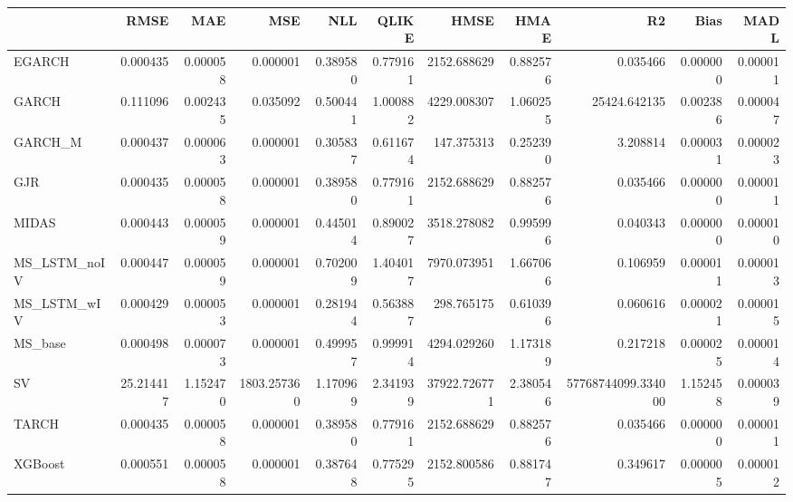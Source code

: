 \begin{tabular}{lrrrrrrrrrr}
\toprule
 & RMSE & MAE & MSE & NLL & QLIKE & HMSE & HMAE & R2 & Bias & MADL \\
\midrule
EGARCH & 0.000435 & 0.000058 & 0.000001 & 0.389580 & 0.779161 & 2152.688629 & 0.882576 & 0.035466 & 0.000000 & 0.000011 \\
GARCH & 0.111096 & 0.002435 & 0.035092 & 0.500441 & 1.000882 & 4229.008307 & 1.060255 & 25424.642135 & 0.002386 & 0.000047 \\
GARCH_M & 0.000437 & 0.000063 & 0.000001 & 0.305837 & 0.611674 & 147.375313 & 0.252390 & 3.208814 & 0.000031 & 0.000023 \\
GJR & 0.000435 & 0.000058 & 0.000001 & 0.389580 & 0.779161 & 2152.688629 & 0.882576 & 0.035466 & 0.000000 & 0.000011 \\
MIDAS & 0.000443 & 0.000059 & 0.000001 & 0.445014 & 0.890027 & 3518.278082 & 0.995996 & 0.040343 & 0.000000 & 0.000010 \\
MS_LSTM_noIV & 0.000447 & 0.000059 & 0.000001 & 0.702009 & 1.404017 & 7970.073951 & 1.667066 & 0.106959 & 0.000011 & 0.000013 \\
MS_LSTM_wIV & 0.000429 & 0.000053 & 0.000001 & 0.281944 & 0.563887 & 298.765175 & 0.610396 & 0.060616 & 0.000021 & 0.000015 \\
MS_base & 0.000498 & 0.000073 & 0.000001 & 0.499957 & 0.999914 & 4294.029260 & 1.173189 & 0.217218 & 0.000025 & 0.000014 \\
SV & 25.214417 & 1.152470 & 1803.257360 & 1.170969 & 2.341939 & 37922.726771 & 2.380546 & 57768744099.334000 & 1.152458 & 0.000039 \\
TARCH & 0.000435 & 0.000058 & 0.000001 & 0.389580 & 0.779161 & 2152.688629 & 0.882576 & 0.035466 & 0.000000 & 0.000011 \\
XGBoost & 0.000551 & 0.000058 & 0.000001 & 0.387648 & 0.775295 & 2152.800586 & 0.881747 & 0.349617 & 0.000005 & 0.000012 \\
\bottomrule
\end{tabular}
